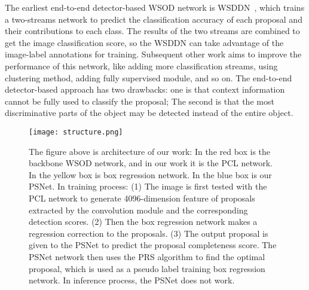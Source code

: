 \documentclass[final,3p,times,twocolumn]{elsarticle}
\begin{document}
The earliest end-to-end detector-based WSOD network is WSDDN~\cite{bilen2016weakly}, which trains a two-streams network to predict the classification accuracy of each proposal and their contributions to each class. The results of the two streams are combined to get the image classification score, so the WSDDN can take advantage of the image-label annotations for training. Subsequent other work aims to improve the performance of this network, like adding more classification streams, using clustering method, adding fully supervised module, and so on. The end-to-end detector-based approach has two drawbacks: one is that context information cannot be fully used to classify the proposal; The second is that the most discriminative parts of the object may be detected instead of the entire object.

\begin{figure*}
	\begin{center}
\texttt{[image: structure.png]}
	\end{center}
	\caption{The figure above is architecture of our work: In the red box is the backbone WSOD network, and in our work it is the PCL network. In the yellow box is box regression network. In the blue box is our PSNet. In training process: (1) The image is first tested with the PCL network to generate 4096-dimension feature of proposals extracted by the convolution module and the corresponding detection scores. (2) Then the box regression network makes a regression correction to the proposals. (3) The output proposal is given to the PSNet to predict the proposal completeness score. The PSNet network then uses the PRS algorithm to find the optimal proposal, which is used as a pseudo label training box regression network. In inference process, the PSNet does not work.}
	\label{fig:figure2}
\end{figure*}
\end{document}

